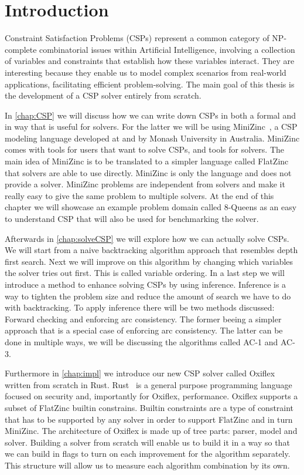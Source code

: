 
\chapter{Introduction}

Constraint Satisfaction Problems (CSPs) represent a common category of NP-complete combinatorial issues within Artificial Intelligence, involving a collection of variables and constraints that establish how these variables interact. They are interesting because they enable us to model complex scenarios from real-world applications, facilitating efficient problem-solving. The main goal of this thesis is the development of a CSP solver entirely from scratch.

In \cref{chap:CSP} we will discuss how we can write down CSPs in both a formal and in way that is useful for solvers. For the latter we will be using MiniZinc~\cite{minizinc:2007}, a CSP modeling language developed at and by Monash University in Australia. MiniZinc comes with tools for users that want to solve CSPs, and tools for solvers. The main idea of MiniZinc is to be translated to a simpler language called FlatZinc that solvers are able to use directly. MiniZinc is only the language and does not provide a solver. MiniZinc problems are independent from solvers and make it really easy to give the same problem to multiple solvers. At the end of this chapter we will showcase an example problem domain called 8-Queens as an easy to understand CSP that will also be used for benchmarking the solver.

Afterwards in \cref{chap:solveCSP} we will explore how we can actually solve CSPs. We will start from a naive backtracking algorithm approach that resembles depth first search. Next we will improve on this algorithm by changing which variables the solver tries out first. This is called variable ordering. In a last step we will introduce a method to enhance solving CSPs by using inference. Inference is a way to tighten the problem size and reduce the amount of search we have to do with backtracking. To apply inference there will be two methods discussed: Forward checking and enforcing arc consistency. The former beeing a simpler approach that is a special case of enforcing arc consistency. The latter can be done in multiple ways, we will be discussing the algorithms called AC-1 and AC-3.

Furthermore in \cref{chap:impl} we introduce our new CSP solver called Oxiflex written from scratch in Rust. Rust~\cite{rust:2014} is a general purpose programming language focused on security and, importantly for Oxiflex, performance. Oxiflex supports a subset of FlatZinc builtin constrains. Builtin constraints are a type of constraint that has to be supported by any solver in order to support FlatZinc and in turn MiniZinc. The architecture of Oxiflex is made up of tree parts: parser, model and solver. Building a solver from scratch will enable us to build it in a way so that we can build in flags to turn on each improvement for the algorithm separately. This structure will allow us to measure each algorithm combination by its own.

